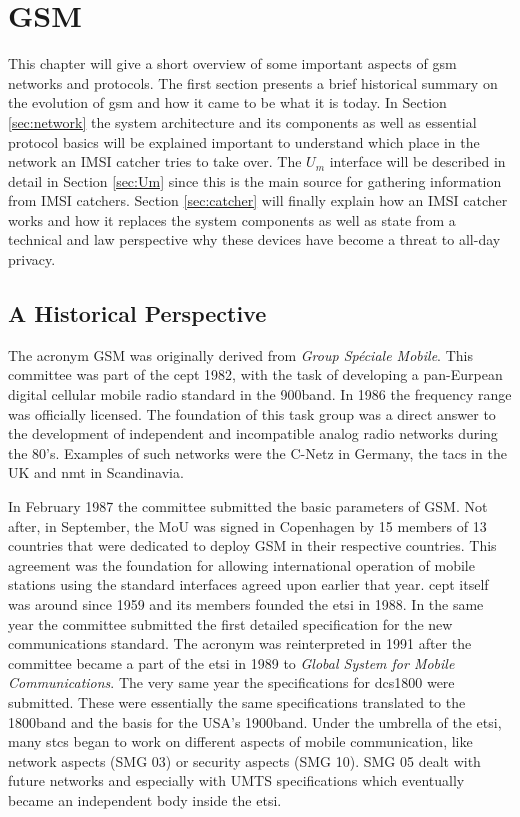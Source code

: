 \chapter{GSM}
\label{ch:gsm}
This chapter will give a short overview of some important aspects of \gls{gsm} networks and protocols.
The first section presents a brief historical summary on the evolution of \gls{gsm} and how it came to be what it is today.
In Section \ref{sec:network} the system architecture and its components as well as essential protocol basics will be explained important to understand which place in the network an IMSI catcher tries to take over.
The $U_m$ interface will be described in detail in Section \ref{sec:Um} since this is the main source for gathering information from IMSI catchers.
Section \ref{sec:catcher} will finally explain how an IMSI catcher works and how it replaces the system components as well as state from a technical and law perspective why these devices have become a threat to all-day privacy. 
 
\section{A Historical Perspective}
The acronym GSM was originally derived from \emph{Group Sp\'{e}ciale Mobile}.
This committee was part of the \gls{cept} 1982, with the task of developing a pan-Eurpean digital cellular mobile radio standard in the 900\MHz band.
In 1986 the frequency range was officially licensed.
The foundation of this task group was a direct answer to the development of independent and incompatible analog radio networks during the 80's.
Examples of such networks were the C-Netz in Germany, the \gls{tacs} in the UK and \gls{nmt} in Scandinavia.

In February 1987 the committee submitted the basic parameters of GSM. 
Not after, in September, the \gls{MoU} was signed in Copenhagen by 15 members of 13 countries that were dedicated to deploy GSM in their respective countries.
This agreement was the foundation for allowing international operation of mobile stations using the standard interfaces agreed upon earlier that year.
\gls{cept} itself was around since 1959 and its members founded the \gls{etsi} in 1988.
In the same year the committee submitted the first detailed specification for the new communications standard.
The acronym was reinterpreted in 1991 after the committee became a part of the \gls{etsi} in 1989 to \emph{Global System for Mobile Communications}.
The very same year the specifications for \gls{dcs1800} were submitted.
These were essentially the same specifications translated to the 1800\MHz band and the basis for the USA's 1900\MHz band.
Under the umbrella of the \gls{etsi}, many \glspl{stc} began to work on different aspects of mobile communication, like network aspects (SMG 03) or security aspects (SMG 10).
SMG 05 dealt with future networks and especially with UMTS specifications which eventually became an independent body inside the \gls{etsi}.


